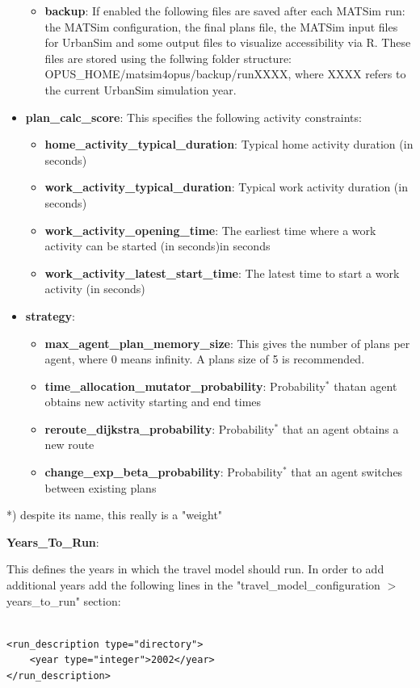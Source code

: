 \begin{itemize}
\begin{itemize}
	\item \textbf{backup}: If enabled the following files are saved  after each MATSim run: the MATSim configuration, the final plans file,  the MATSim input files for UrbanSim and some output files to visualize  accessibility via R. These files are stored using the follwing folder  structure: OPUS\_HOME/matsim4opus/backup/runXXXX, where XXXX refers to  the current UrbanSim simulation year.
\end{itemize}
	\item \textbf{plan\_calc\_score}: This specifies the following activity constraints:   
\begin{itemize}
	\item \textbf{home\_activity\_typical\_duration}: Typical home activity duration (in seconds)
	\item \textbf{work\_activity\_typical\_duration}: Typical work activity duration (in seconds)
	\item \textbf{work\_activity\_opening\_time}: The earliest time where a work activity can be started (in seconds)in seconds
	\item \textbf{work\_activity\_latest\_start\_time}: The latest time to start a work activity (in seconds)
\end{itemize}
	\item \textbf{strategy}:   
\begin{itemize}
	\item \textbf{max\_agent\_plan\_memory\_size}: This gives the number of plans per agent, where 0 means infinity. A plans size of 5 is recommended.
	\item \textbf{time\_allocation\_mutator\_probability}: Probability$^*$ thatan agent obtains new activity starting and end times
	\item \textbf{reroute\_dijkstra\_probability}: Probability$^*$ that an agent obtains a new route
	\item \textbf{change\_exp\_beta}\textbf{\_probability}: Probability$^*$ that an agent switches between existing plans
\end{itemize}
\end{itemize}

*) despite its name, this really is a "weight"

\textbf{Years\_To\_Run}:

This defines the years in which the travel model should run. In order  to add additional years add the following lines in the  "travel\_model\_configuration $>$ years\_to\_run" section:
\begin{verbatim}

<run_description type="directory">
    <year type="integer">2002</year>
</run_description>
\end{verbatim}

